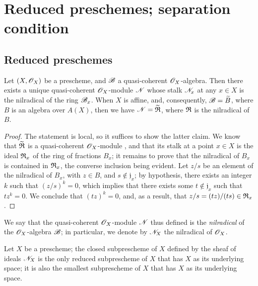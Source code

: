 \section{Reduced preschemes; separation condition}
\label{section:1.5}

\subsection{Reduced preschemes}
\label{subsection:1.5.1}

\begin{proposition}[5.1.1]
\label{1.5.1.1}
Let $(X,\mathscr{O}_X)$ be a prescheme, and $\mathscr{B}$ a quasi-coherent $\mathscr{O}_X$-algebra.
Then there exists a unique quasi-coherent $\mathscr{O}_X$-module $\mathscr{N}$ whose stalk $\mathscr{N}_x$ at any $x\in X$ is the nilradical of the ring $\mathscr{B}_x$.
When $X$ is affine, and, consequently, $\mathscr{B}=\widetilde{B}$, where $B$ is an algebra over $A(X)$, then we have $\mathscr{N}=\widetilde{\mathfrak{R}}$, where $\mathfrak{R}$ is the nilradical of $B$.
\end{proposition}

\begin{proof}
\label{proof-1.5.1.1}
The statement is local, so it suffices to show the latter claim.
We know that $\widetilde{\mathfrak{R}}$ is a quasi-coherent $\mathscr{O}_X$-module , and that its stalk at a point $x\in X$ is the ideal $\mathfrak{R}_x$ of the ring of fractions $B_x$;
it remains to prove that the nilradical of $B_x$ is contained in $\mathfrak{R}_x$, the converse inclusion being evident.
Let $z/s$ be an element of the nilradical of $B_x$, with $z\in B$, and $s\not\in\mathfrak{j}_x$;
by hypothesis, there exists an integer $k$ such that $(z/s)^k=0$, which implies that there exists some $t\not\in\mathfrak{j}_x$ such that $tz^k=0$.
We conclude that $(tz)^k=0$, and, as a result, that $z/s=(tz)/(ts)\in\mathfrak{R}_x$.
\end{proof}

We say that the quasi-coherent $\mathscr{O}_X$-module $\mathscr{N}$ thus defined is the \emph{nilradical} of the $\mathscr{O}_X$-algebra $\mathscr{B}$; in particular, we denote by $\mathscr{N}_X$ the nilradical of $\mathscr{O}_X$.

\begin{corollary}[5.1.2]
\label{1.5.1.2}
Let $X$ be a prescheme;
the closed subprescheme of $X$ defined by the sheaf of ideals $\mathscr{N}_X$ is the only reduced subprescheme  of $X$ that has $X$ as its underlying space;
it is also the smallest subprescheme of $X$ that has $X$ as its underlying space.
\end{corollary}

